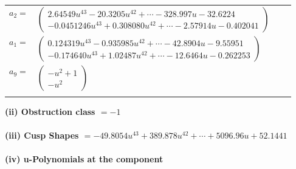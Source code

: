 \documentclass[1p]{elsarticle_modified}
\theoremstyle{definition}
\begin{document}
\begin{tabular}{m{7pt} m{180pt} m{7pt} m{180pt} }
\flushright $a_{2}=$&$\begin{pmatrix}2.64549 u^{43}-20.3205 u^{42}+\cdots-328.997 u-32.6224\\-0.0451246 u^{43}+0.308080 u^{42}+\cdots-2.57914 u-0.402041\end{pmatrix}$ \\
\flushright $a_{1}=$&$\begin{pmatrix}0.124319 u^{43}-0.935985 u^{42}+\cdots-42.8904 u-9.55951\\-0.174640 u^{43}+1.02487 u^{42}+\cdots-12.6464 u-0.262253\end{pmatrix}$ \\
\flushright $a_{9}=$&$\begin{pmatrix}- u^2+1\\- u^2\end{pmatrix}$\\&\end{tabular}
\flushleft \textbf{(ii) Obstruction class $= -1$}\\~\\
\flushleft \textbf{(iii) Cusp Shapes $= -49.8054 u^{43}+389.878 u^{42}+\cdots+5096.96 u+52.1441$}\\~\\
\newpage\renewcommand{\arraystretch}{1}
\flushleft \textbf{(iv) u-Polynomials at the component}\newline \\
\end{document}

